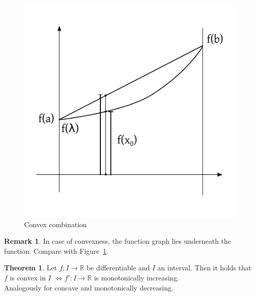 \documentclass[a4paper,landscape,twocolumn]{article}
\theoremstyle{definition}
\newtheorem{theorem}{Theorem}
\newtheorem{rem}{Remark}
\begin{document}
%
\begin{figure}[!h]
  \begin{center}
    \includegraphics{img/convex_combination.pdf}
    \caption{Convex combination}
    \label{img:convex-combination}
  \end{center}
\end{figure}
%
\begin{rem}
  In case of convexness, the function graph lies underneath the function.
  Compare with Figure~\ref{img:convex-combination}.
\end{rem}
%
\begin{theorem}
  Let $f: I \to \mathbb R$ be differentiable and $I$ an interval.
  Then it holds that $f$ is convex in $I$ $\iff f': I \to \mathbb R$ is monotonically increasing. \\
  Analogously for concave and monotonically decreasing.
\end{theorem}
%
\end{document}
